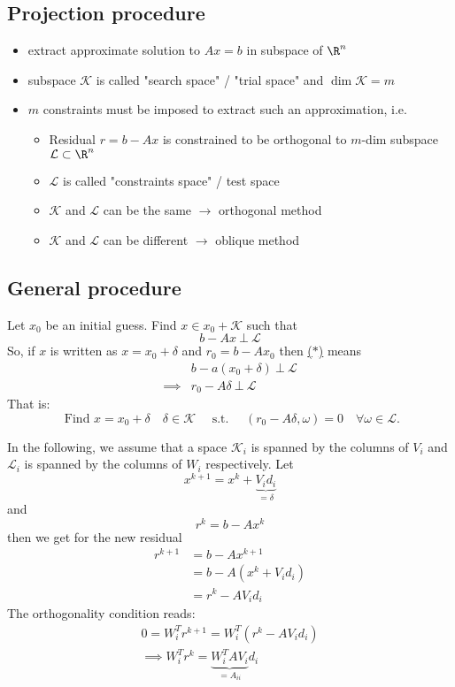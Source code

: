 \subsection*{Projection procedure}
\begin{itemize}
	\item extract approximate solution to $Ax=b$ in subspace of $\R^{n}$
	\item subspace $\mathcal{K}$ is called "search space" / "trial space" and $\dim \mathcal{K} = m$
	\item $m$ constraints must be imposed to extract such an approximation, i.e.
		\begin{itemize}
			\item Residual $r = b -Ax$ is constrained to be orthogonal to $m$-dim subspace $\mathcal{L} \subset  \R^{n}$
			\item $\mathcal{L}$ is called "constraints space" / test space
			\item $\mathcal{K}$ and $\mathcal{L}$ can be the same $\rightarrow$ orthogonal method
			\item $\mathcal{K}$ and $\mathcal{L}$ can be different $\rightarrow$ oblique method
		\end{itemize}
\end{itemize}

\subsection*{General procedure}
\label{sec:General procedure}

Let $x_0$ be an initial guess. Find $x \in x_0 + \mathcal{K}$ such that
\begin{equation}\label{eq:generalproceedstar}\tag{$\ast$}
	b - Ax ~\bot~ \mathcal{L}
\end{equation}
So, if $x$ is written as $x=x_0 + \delta $ and $r_0 = b -Ax_0$ then \href{eq:generalproceedstar}{($\ast$)} means
\begin{align*}
	&b-a(x_0 + \delta ) ~\bot~\mathcal{L} \\
	\implies &r_0 - A \delta ~\bot~ \mathcal{L}
\end{align*}
That is:
\[
	\text{ Find } x = x_0 + \delta \quad \delta  \in \mathcal{K} \quad\text{ s.t. }\quad (r_0 - A \delta  , \omega ) = 0 \quad \forall \omega  \in \mathcal{L}
.\] 

In the following, we assume that a space $\mathcal{K}_{i}$ is spanned by the columns of $V_{i}$ and $\mathcal{L}_{i}$ is spanned by the columns of $W_{i}$ respectively.
Let
\[
x^{k+1} = x^{k} + \underbrace{V_{i}d_{i}}_{=\delta } 
\] 
and
\[
r^{k} = b - Ax^{k}
\] 
then we get for the new residual
\begin{align*}
	r^{k+1} &= b - Ax^{k+1} \\
			&= b- A(x^{k} + V_{i}d_{i}) \\
			&= r^{k} - AV_{i}d_{i}
\end{align*}
The orthogonality condition reads:
\begin{align*}
	0 = W_{i}^{T}r^{k+1} = W_{i}^{T}(r^{k}- AV_{i}d_{i}) \\
	\implies W_{i}^{T} r^{k} = \underbrace{W_{i}^{T} A V_{i}}_{= A_{ii}} d_{i} 
\end{align*}

